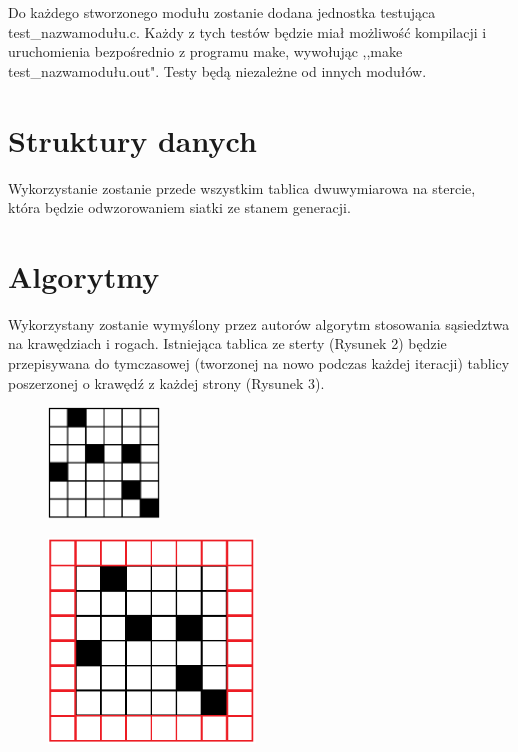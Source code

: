 \documentclass{article}
\begin{document}
Do każdego stworzonego modułu zostanie dodana 
jednostka testująca test\_nazwamodułu.c. 
Każdy z tych testów będzie miał możliwość kompilacji i uruchomienia bezpośrednio z programu make, wywołując ,,make test\_nazwamodułu.out". 
Testy będą niezależne od innych modułów.


\section{Struktury danych}
Wykorzystanie zostanie przede wszystkim tablica dwuwymiarowa na stercie, która będzie odwzorowaniem siatki ze stanem generacji.
\section{Algorytmy}
Wykorzystany zostanie wymyślony przez autorów algorytm stosowania sąsiedztwa na krawędziach i rogach. 
Istniejąca tablica ze sterty (Rysunek 2) będzie przepisywana do tymczasowej (tworzonej na nowo podczas każdej iteracji) tablicy poszerzonej o krawędź z każdej strony (Rysunek 3). 

\begin{figure} [hbt!]
    \centering
    \includegraphics[width=3cm]{first.png}
    
\end{figure}

\begin{figure} [hbt!]
    \centering
    \includegraphics[width=5.5cm]{second.png}
    
\end{figure}
\end{document}

